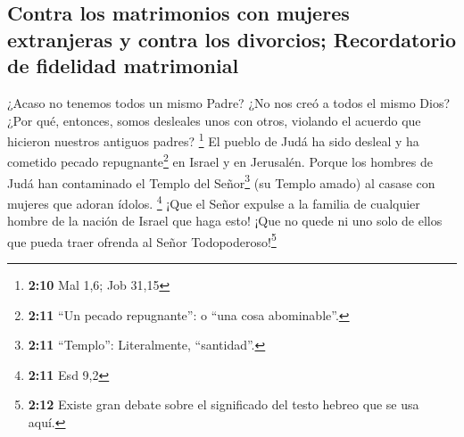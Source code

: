 \hypertarget{contra-los-matrimonios-con-mujeres-extranjeras-y-contra-los-divorcios-recordatorio-de-fidelidad-matrimonial}{%
\subsection{Contra los matrimonios con mujeres extranjeras y contra los
divorcios; Recordatorio de fidelidad
matrimonial}\label{contra-los-matrimonios-con-mujeres-extranjeras-y-contra-los-divorcios-recordatorio-de-fidelidad-matrimonial}}

 ¿Acaso no tenemos todos un mismo Padre? ¿No nos creó a
todos el mismo Dios? ¿Por qué, entonces, somos desleales unos con otros,
violando el acuerdo que hicieron nuestros antiguos padres? \footnote{\textbf{2:10}
  Mal 1,6; Job 31,15}  El pueblo de Judá ha sido desleal
y ha cometido pecado repugnante\footnote{\textbf{2:11} ``Un pecado
  repugnante'': o ``una cosa abominable''.} en Israel y en Jerusalén.
Porque los hombres de Judá han contaminado el Templo del
Señor\footnote{\textbf{2:11} ``Templo'': Literalmente, ``santidad''.}
(su Templo amado) al casase con mujeres que adoran ídolos. \footnote{\textbf{2:11}
  Esd 9,2}  ¡Que el Señor expulse a la familia de
cualquier hombre de la nación de Israel que haga esto! ¡Que no quede ni
uno solo de ellos que pueda traer ofrenda al Señor
Todopoderoso!\footnote{\textbf{2:12} Existe gran debate sobre el
  significado del testo hebreo que se usa aquí.}

